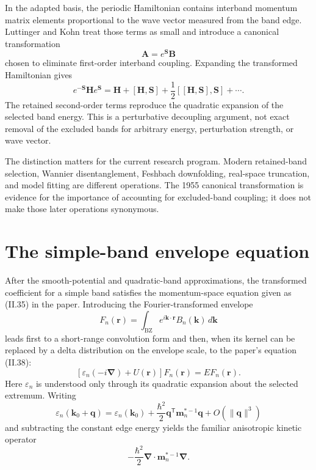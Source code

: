 In the adapted basis, the periodic Hamiltonian contains interband momentum
matrix elements proportional to the wave vector measured from the band edge.
Luttinger and Kohn treat those terms as small and introduce a canonical
transformation
\begin{equation}
  \mathbf A=e^{\mathbf S}\mathbf B
\end{equation}
chosen to eliminate first-order interband coupling. Expanding the transformed
Hamiltonian gives
\begin{equation}
  e^{-\mathbf S}\mathbf H e^{\mathbf S}
  =
  \mathbf H+[\mathbf H,\mathbf S]
  +\frac{1}{2}[[\mathbf H,\mathbf S],\mathbf S]+\cdots.
\end{equation}
The retained second-order terms reproduce the quadratic expansion of the
selected band energy. This is a perturbative decoupling argument, not exact
removal of the excluded bands for arbitrary energy, perturbation strength, or
wave vector.

The distinction matters for the current research program. Modern retained-band
selection, Wannier disentanglement, Feshbach downfolding, real-space
truncation, and model fitting are different operations. The 1955 canonical
transformation is evidence for the importance of accounting for excluded-band
coupling; it does not make those later operations synonymous.

\section{The simple-band envelope equation}

After the smooth-potential and quadratic-band approximations, the transformed
coefficient for a simple band satisfies the momentum-space equation given as
(II.35) in the paper. Introducing the Fourier-transformed envelope
\begin{equation}
  F_n(\mathbf r)
  =
  \int_{\mathrm{BZ}}
  e^{i\mathbf k\cdot\mathbf r}B_n(\mathbf k)\,d\mathbf k
\end{equation}
leads first to a short-range convolution form and then, when its kernel can be
replaced by a delta distribution on the envelope scale, to the paper's equation
(II.38):
\begin{equation}
  \left[
    \varepsilon_n(-i\boldsymbol\nabla)
    +U(\mathbf r)
  \right]F_n(\mathbf r)
  =
  E F_n(\mathbf r).
  \label{eq:lk-envelope-operator}
\end{equation}
Here $\varepsilon_n$ is understood only through its quadratic expansion about
the selected extremum. Writing
\begin{equation}
  \varepsilon_n(\mathbf k_0+\mathbf q)
  =
  \varepsilon_n(\mathbf k_0)
  +
  \frac{\hbar^2}{2}
  \mathbf q^{\mathsf T}\mathbf m_n^{*-1}\mathbf q
  +O(\lVert\mathbf q\rVert^3)
\end{equation}
and subtracting the constant edge energy yields the familiar anisotropic
kinetic operator
\begin{equation}
  -\frac{\hbar^2}{2}
  \boldsymbol\nabla\mathbin{\cdot}
  \mathbf m_n^{*-1}
  \boldsymbol\nabla.
\end{equation}

